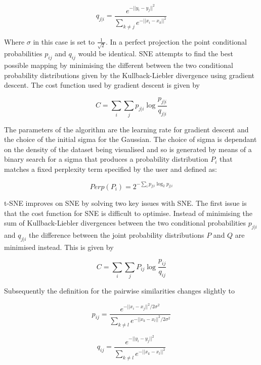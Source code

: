 \begin{equation}
	q_{j|i} = \frac{e^{-||y_i - y_j ||^2}}{\sum_{k\neq j} e^{-||x_i - x_k ||^2}}
\end{equation}

Where $\sigma$ in this case is set to $\frac{1}{\sqrt{2}}$. In a perfect projection the point conditional probabilities $p_{ij}$ and $q_{ij}$ would be identical. SNE attempts to find the best possible mapping by minimising the different between the two conditional probability distributions given by the Kullback-Liebler divergence using gradient descent. The cost function used by gradient descent is given by

\begin{equation}
	C = \sum\limits_i \sum\limits_j p_{j|i} \log \frac{p_{j|i}}{q_{j|i}}
\end{equation}

The parameters of the algorithm are the learning rate for gradient descent and the choice of the initial sigma for the Gaussian. The choice of sigma is dependant on the density of the dataset being visualised and so is generated by means of a binary search for a sigma that produces a probability distribution $P_{i}$ that matches a fixed perplexity term specified by the user and defined as:

\begin{equation}
	Perp(P_i) = 2^{- \sum\limits_i p_{j|i}\log_{2} p_{j|i}}
\end{equation}

t-SNE improves on SNE by solving two key issues with SNE. The first issue is that the cost function for SNE is difficult to optimise. Instead of minimising the sum of Kullback-Liebler divergences between the two conditional probabilities $p_{j|i}$ and $q_{j|i}$ the difference between the joint probability distributions $P$ and $Q$ are minimised instead. This is given by

\begin{equation}
	C = \sum\limits_i \sum\limits_j P_{ij} \log \frac{p_{ij}}{q_{ij}}
\end{equation}

Subsequently the definition for the pairwise similarities changes slightly to

\begin{equation}
	p_{ij} = \frac{e^{-||x_i - x_j ||^2 / 2\sigma^2}}{\sum_{k\neq l} e^{-||x_k - x_l ||^2 / 2\sigma^2}}
\end{equation}

\begin{equation}
	q_{ij} = \frac{e^{-||y_i - y_j ||^2}}{\sum_{k\neq l} e^{-||x_k - x_l ||^2}}
\end{equation}

